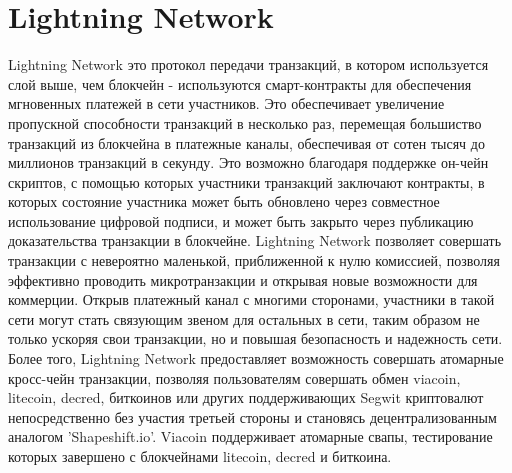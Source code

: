 \documentclass{article}
\begin{document}
\section{Lightning Network}\label{sec: The Lightning Network}
\cite{lightningNetwork} Lightning Network это протокол передачи транзакций, в котором используется
слой выше, чем блокчейн - используются смарт-контракты для обеспечения мгновенных
платежей в сети участников.
Это обеспечивает увеличение пропускной способности транзакций в несколько раз,
перемещая большиство транзакций из блокчейна в платежные каналы, обеспечивая
от сотен тысяч до миллионов транзакций в секунду. Это возможно благодаря поддержке
он-чейн скриптов, с помощью которых участники транзакций заключают контракты, в которых
состояние участника может быть обновлено через совместное использование цифровой
подписи, и может быть закрыто через публикацию доказательства транзакции в блокчейне.
\newline \newline \noindent
Lightning Network позволяет совершать транзакции с невероятно маленькой, приближенной к нулю комиссией, позволяя эффективно проводить микротранзакции и открывая новые возможности для коммерции. Открыв платежный канал с многими сторонами, участники в такой сети могут стать связующим звеном для остальных в сети, таким образом не только ускоряя свои транзакции, но и повышая безопасность и надежность сети.
\newline \newline \noindent
Более того, Lightning Network предоставляет возможность совершать атомарные кросс-чейн транзакции, позволяя пользователям совершать обмен viacoin, litecoin, decred, биткоинов или других поддерживающих Segwit криптовалют непосредственно без участия третьей стороны и становясь децентрализованным аналогом 'Shapeshift.io'. Viacoin поддерживает атомарные свапы, тестирование которых завершено \cite{viaatomic} с блокчейнами litecoin, decred и биткоина.
\newpage
\end{document}
